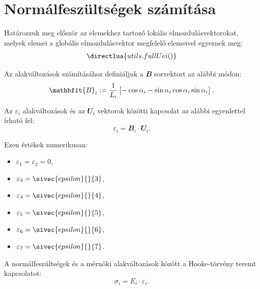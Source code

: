 \documentclass[a4paper, 12pt]{scrartcl}
\newcommand{\rvec}[1]{\mathbfit{#1}}
\begin{document}



\section{Normálfeszültségek számítása} %
\label{sec:Normálfeszültségek számítása}

Határozzuk meg először az elemekhez tartozó lokális elmozdulásvektorokat,
melyek elemei a globális elmozdulásvektor megfelelő elemeivel egyeznek meg:
\begin{equation}
  \begin{aligned}
    \directlua{utils.fullUei()}
  \end{aligned}
\end{equation}

Az alakváltozások számításához definiáljuk a $\rvec B$ sorvektort az alábbi módon:
\begin{equation}
  \rvec B_i := \frac{1}{L_i} \begin{bmatrix}
    -\cos \a_i
    -\sin \a_i
    \cos \a_i
    \sin \a_i
  \end{bmatrix}.
  \label{eq:B}
\end{equation}

Az $\varepsilon_i$ alakváltozások és az $\rvec U_i$ vektorok közötti kapcsolat
az alábbi egyenlettel írható fel:
\begin{equation}
  \varepsilon_i = \rvec B_i \cdot \rvec U_i.
  \label{eq:eps}
\end{equation}

Ezen értékek numerikusan:
\begin{multicols}{3}
  \begin{itemize}
    \item $\varepsilon_1 = \varepsilon_2 = 0,$
    \item $\varepsilon_3 = \sivec{epsilon}{}{3}$,
    \item $\varepsilon_4 = \sivec{epsilon}{}{4}$,
    \item $\varepsilon_5 = \sivec{epsilon}{}{5}$,
    \item $\varepsilon_6 = \sivec{epsilon}{}{6}$,
    \item $\varepsilon_7 = \sivec{epsilon}{}{7}$.
  \end{itemize}
\end{multicols}

A normálfeszültségek és a mérnöki alakváltozások között a Hooke-törvény teremt
kapcsolatot:
\begin{equation}
  \sigma_i = E_i \cdot \varepsilon_i.
  \label{eq:Hooke}
\end{equation}
\end{document}
